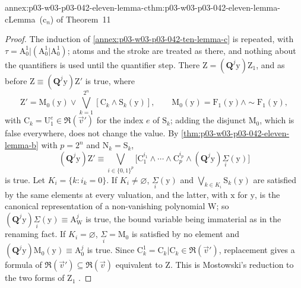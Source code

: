 \begin{annexitem}{annex:p03-w03-p03-042-eleven-lemma-c}{thm:p03-w03-p03-042-eleven-lemma-c}{Lemma~(\(\mathrm c_n\)) of Theorem~11}
\begin{proof}
The induction of \cref{annex:p03-w03-p03-042-ten-lemma-c} is repeated,
with \(\tau=\mathrm A^1_0|(\mathrm A^1_0|\mathrm A^1_0)\); atoms and the
stroke are treated as there, and nothing about the quantifiers is used
until the quantifier step.  There \(\mathrm Z=(\mathbf Q^j\mathrm y)
\mathrm Z_1\), and as before \(\mathrm Z\equiv(\mathbf Q^j\mathrm y)
\mathrm Z'\) is true, where
\[
 \mathrm Z'=\mathrm M_0(\mathrm y)\vee\bigvee_{k=1}^{2^n}[\mathrm
 C_k\wedge\mathrm S_k(\mathrm y)],\qquad \mathrm M_0(\mathrm y)=\mathrm
 F_1(\mathrm y)\wedge{\sim}\mathrm F_1(\mathrm y),
\]
with \(\mathrm C_k=\mathrm U_1^{e}\in\mathfrak R(\vec v')\) for the index
\(e\) of \(\mathrm S_k\); adding the disjunct \(\mathrm M_0\), which is
false everywhere, does not change the value.  By
\cref{thm:p03-w03-p03-042-eleven-lemma-b} with \(p=2^n\) and \(\mathrm
N_k=\mathrm S_k\),
\[
 (\mathbf Q^j\mathrm y)\mathrm Z'\equiv\bigvee_{i\in\{0,1\}^p}\bigl[
 \mathrm C_1^{i_1}\wedge\cdots\wedge\mathrm C_p^{i_p}\wedge(\mathbf
 Q^j\mathrm y)\underset{i}{\Sigma}(\mathrm y)\bigr]
\]
is true.  Let \(K_i=\{k:i_k=0\}\).  If \(K_i\neq\varnothing\),
\(\underset{i}{\Sigma}(\mathrm y)\) and \(\bigvee_{k\in K_i}\mathrm
S_k(\mathrm y)\) are satisfied by the same elements at every valuation,
and the latter, with \(\mathrm x\) for \(\mathrm y\), is the canonical
representation of a non-vanishing polynomial \(\mathrm W\); so
\((\mathbf Q^j\mathrm y)\underset{i}{\Sigma}(\mathrm y)\equiv\mathrm
A^j_{\mathrm W}\) is true, the bound variable being immaterial as in the
renaming fact.  If \(K_i=\varnothing\), \(\underset{i}{\Sigma}=\mathrm
M_0\) is satisfied by no element and \((\mathbf Q^j\mathrm y)\mathrm
M_0(\mathrm y)\equiv\mathrm A^j_0\) is true.  Since \(\mathrm C_k^1=
\mathrm C_k|\mathrm C_k\in\mathfrak R(\vec v')\), replacement gives a
formula of \(\mathfrak R(\vec v')\subseteq\mathfrak R(\vec v)\)
equivalent to \(\mathrm Z\).  This is Mostowski's reduction to the two
forms of \(\mathrm Z_1\) \cite[p.~33]{Mostowski1957}.
\end{proof}
\end{annexitem}

